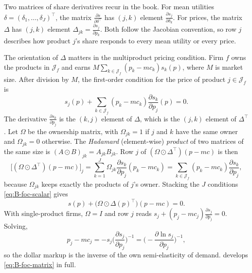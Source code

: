 Two matrices of share derivatives recur in the book. For mean utilities $\delta = (\delta_1, \dots, \delta_J)^\top$, the
matrix $\frac{\partial s}{\partial \delta^\top}$ has $(j, k)$ element $\frac{\partial s_j}{\partial \delta_k}$. For prices,
the matrix $\Delta$ has $(j, k)$ element $\Delta_{jk} = \frac{\partial s_j}{\partial p_k}$. Both follow the Jacobian
convention, so row $j$ describes how product $j$'s share responds to every mean utility or every price.

The orientation of $\Delta$ matters in the multiproduct pricing condition. Firm $f$ owns the products in
$\mathcal{J}_f$ and earns $M\sum_{k \in \mathcal{J}_f}(p_k - mc_k)s_k(p)$, where $M$ is market size. After division
by $M$, the first-order condition for the price of product $j \in \mathcal{J}_f$ is
\begin{equation}\label{eq:B-foc-scalar}
s_j(p) + \sum_{k \in \mathcal{J}_f}(p_k - mc_k)\frac{\partial s_k}{\partial p_j}(p) = 0 .
\end{equation}
The derivative $\frac{\partial s_k}{\partial p_j}$ is the $(k, j)$ element of $\Delta$, which is the $(j, k)$ element of
$\Delta^\top$. Let $\Omega$ be the ownership matrix, with $\Omega_{jk} = 1$ if $j$ and $k$ have the same owner and
$\Omega_{jk} = 0$ otherwise. The \emph{Hadamard} (element-wise) \emph{product} of two matrices of the same size is
$(A \odot B)_{jk} = A_{jk}B_{jk}$. Row $j$ of $(\Omega \odot \Delta^\top)(p - mc)$ is then
\begin{equation*}
\big[(\Omega \odot \Delta^\top)(p - mc)\big]_j = \sum_{k = 1}^{J}\Omega_{jk}\frac{\partial s_k}{\partial p_j}(p_k - mc_k)
= \sum_{k \in \mathcal{J}_f}(p_k - mc_k)\frac{\partial s_k}{\partial p_j} ,
\end{equation*}
because $\Omega_{jk}$ keeps exactly the products of $j$'s owner. Stacking the $J$ conditions \eqref{eq:B-foc-scalar}
gives
\begin{equation}\label{eq:B-foc-matrix}
s(p) + \big(\Omega \odot \Delta(p)^\top\big)(p - mc) = 0 .
\end{equation}
With single-product firms, $\Omega = I$ and row $j$ reads $s_j + (p_j - mc_j)\frac{\partial s_j}{\partial p_j} = 0$.
Solving,
\begin{equation*}
p_j - mc_j = -s_j\Big(\frac{\partial s_j}{\partial p_j}\Big)^{-1} = \Big(-\frac{\partial \ln s_j}{\partial p_j}\Big)^{-1} ,
\end{equation*}
so the dollar markup is the inverse of the own semi-elasticity of demand.  develops
\eqref{eq:B-foc-matrix} in full.

